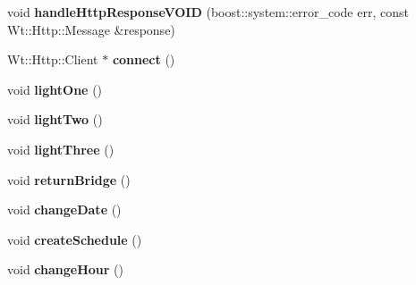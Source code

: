 \begin{DoxyCompactItemize}
\item 
void {\bfseries handle\+Http\+Response\+V\+O\+ID} (boost\+::system\+::error\+\_\+code err, const Wt\+::\+Http\+::\+Message \&response)\hypertarget{classSingleSchedulerControlWidget_a8058b8110567576b3abd02142f09a793}{}\label{classSingleSchedulerControlWidget_a8058b8110567576b3abd02142f09a793}

\item 
Wt\+::\+Http\+::\+Client $\ast$ {\bfseries connect} ()\hypertarget{classSingleSchedulerControlWidget_a88870dd05404fcda5613c04e87eddba6}{}\label{classSingleSchedulerControlWidget_a88870dd05404fcda5613c04e87eddba6}

\item 
void {\bfseries light\+One} ()\hypertarget{classSingleSchedulerControlWidget_aae736f1da5036a5edaaacbb084c92f29}{}\label{classSingleSchedulerControlWidget_aae736f1da5036a5edaaacbb084c92f29}

\item 
void {\bfseries light\+Two} ()\hypertarget{classSingleSchedulerControlWidget_a23b450759aa7ed01b811e286d06f4ba7}{}\label{classSingleSchedulerControlWidget_a23b450759aa7ed01b811e286d06f4ba7}

\item 
void {\bfseries light\+Three} ()\hypertarget{classSingleSchedulerControlWidget_a48138931a6f168024aa5fa8523378714}{}\label{classSingleSchedulerControlWidget_a48138931a6f168024aa5fa8523378714}

\item 
void {\bfseries return\+Bridge} ()\hypertarget{classSingleSchedulerControlWidget_af53d54694b006e60898b7b6aa3f85ae8}{}\label{classSingleSchedulerControlWidget_af53d54694b006e60898b7b6aa3f85ae8}

\item 
void {\bfseries change\+Date} ()\hypertarget{classSingleSchedulerControlWidget_ac1eb54766118ff619ac32ba3fcbe20ea}{}\label{classSingleSchedulerControlWidget_ac1eb54766118ff619ac32ba3fcbe20ea}

\item 
void {\bfseries create\+Schedule} ()\hypertarget{classSingleSchedulerControlWidget_ae35320ca0cbc22ba4ce62376903b3b5f}{}\label{classSingleSchedulerControlWidget_ae35320ca0cbc22ba4ce62376903b3b5f}

\item 
void {\bfseries change\+Hour} ()\hypertarget{classSingleSchedulerControlWidget_aa0130edea1c3391a5ebf488d69a53332}{}\label{classSingleSchedulerControlWidget_aa0130edea1c3391a5ebf488d69a53332}


\end{DoxyCompactItemize}
